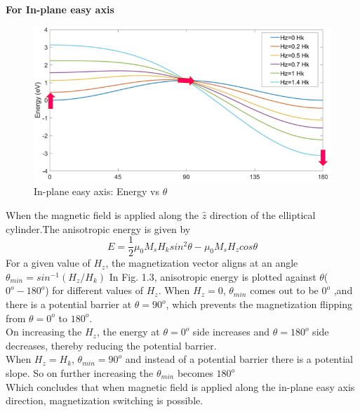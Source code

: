 \textbf{For In-plane easy axis}\\
\begin{figure}[H]
	\centering
   \includegraphics[scale=0.56]{Images/21.png} 
   \caption{In-plane easy axis: Energy vs $\theta$}
\end{figure}
When the magnetic field is applied along the $\hat{z}$ direction of the elliptical cylinder.The anisotropic energy is given by 
\[E=\frac{1}{2}\mu_0M_sH_ksin^2\theta - \mu_0M_sH_zcos\theta\]
For a given value of $H_z$, the magnetization vector aligns at an angle $\theta_{min}=sin^{-1}(H_z/H_k)$
In Fig. 1.3, anisotropic energy is plotted against $\theta$($0^o - 180^o$) for different values of $H_z$.
When $H_z=0$, $\theta_{min}$ comes out to be $0^o$ ,and there is a potential barrier at $\theta=90^o$, which prevents the magnetization flipping from $\theta=0^o$ to $180^o$. \\
On increasing the $H_z$, the energy at $\theta=0^o$ side increases and $\theta=180^o$ side decreases, thereby reducing the potential barrier.\\
When $H_z=H_k$, $\theta_{min}=90^o$ and instead of a potential barrier there is a potential slope. So on further increasing the $\theta_{min}$ becomes $180^o$\\
Which concludes that when magnetic field is applied along the in-plane easy axis direction, magnetization switching is possible.  

